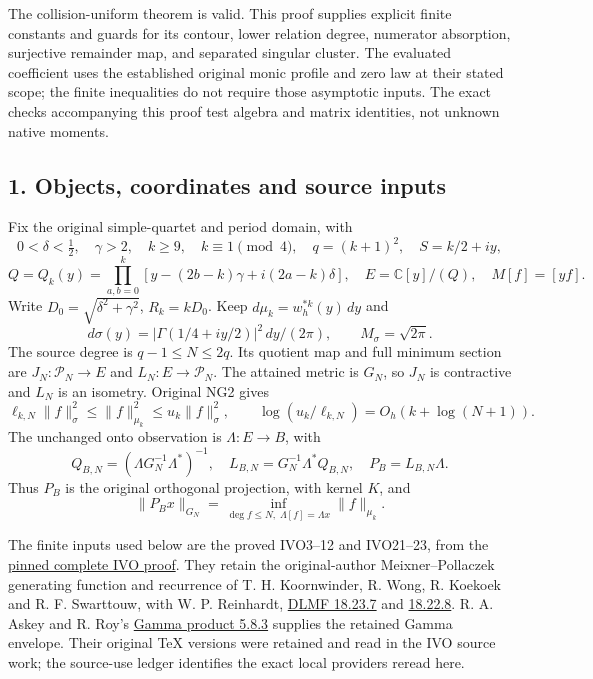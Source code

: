 \documentclass[11pt]{article}
\begin{document}
The collision-uniform theorem is valid. This proof supplies explicit finite constants and guards for its contour, lower relation degree, numerator absorption, surjective remainder map, and separated singular cluster. The evaluated coefficient uses the established original monic profile and zero law at their stated scope; the finite inequalities do not require those asymptotic inputs. The exact checks accompanying this proof test algebra and matrix identities, not unknown native moments.

\subsection{1. Objects, coordinates and source inputs}\label{objects-coordinates-and-source-inputs}

Fix the original simple-quartet and period domain, with \[
0<\delta<\tfrac12,\quad \gamma>2,\quad k\ge9,\quad k\equiv1\pmod4,\quad
q=(k+1)^2,\quad S=k/2+iy,
\] \[
Q=Q_k(y)=\prod_{a,b=0}^{k}[y-(2b-k)\gamma+i(2a-k)\delta],
\quad E=\mathbb C[y]/(Q),\quad M[f]=[yf].
\tag{RF1}
\] Write \(D_0=\sqrt{\delta^2+\gamma^2}\), \(R_k=kD_0\). Keep \(d\mu_k=w_h^{*k}(y)\,dy\) and \[
d\sigma(y)=|\Gamma(1/4+iy/2)|^2\,dy/(2\pi),\qquad
M_\sigma=\sqrt{2\pi}.
\] The source degree is \(q-1\le N\le2q\). Its quotient map and full minimum section are \(J_N:\mathcal P_N\to E\) and \(L_N:E\to\mathcal P_N\). The attained metric is \(G_N\), so \(J_N\) is contractive and \(L_N\) is an isometry. Original NG2 gives \[
\ell_{k,N}\|f\|_\sigma^2\le\|f\|_{\mu_k}^2\le u_k\|f\|_\sigma^2,
\qquad \log(u_k/\ell_{k,N})=O_h(k+\log(N+1)).
\tag{RF2}
\] The unchanged onto observation is \(\Lambda:E\to B\), with \[
Q_{B,N}=(\Lambda G_N^{-1}\Lambda^*)^{-1},\quad
L_{B,N}=G_N^{-1}\Lambda^*Q_{B,N},\quad P_B=L_{B,N}\Lambda.
\tag{RF3}
\] Thus \(P_B\) is the original orthogonal projection, with kernel \(K\), and \[
\|P_Bx\|_{G_N}
=\inf_{\deg f\le N,\;\Lambda[f]=\Lambda x}\|f\|_{\mu_k}.
\tag{RF4}
\]

The finite inputs used below are the proved IVO3--12 and IVO21--23, from the \href{https://github.com/KokunoYumeto/zeta-function-research-reader/blob/edd4008690952fb8568a01744e49ad7e180401e9/workbenches/splitzero-tandem/continuations/20260921-original-observation/INDEPENDENT_FINITE_OBSERVATION.tex}{pinned complete IVO proof}. They retain the original-author Meixner--Pollaczek generating function and recurrence of T. H. Koornwinder, R. Wong, R. Koekoek and R. F. Swarttouw, with W. P. Reinhardt, \href{https://dlmf.nist.gov/18.23.E7}{DLMF 18.23.7} and \href{https://dlmf.nist.gov/18.22.E8}{18.22.8}. R. A. Askey and R. Roy's \href{https://dlmf.nist.gov/5.8.E3}{Gamma product 5.8.3} supplies the retained Gamma envelope. Their original TeX versions were retained and read in the IVO source work; the source-use ledger identifies the exact local providers reread here.
\end{document}
